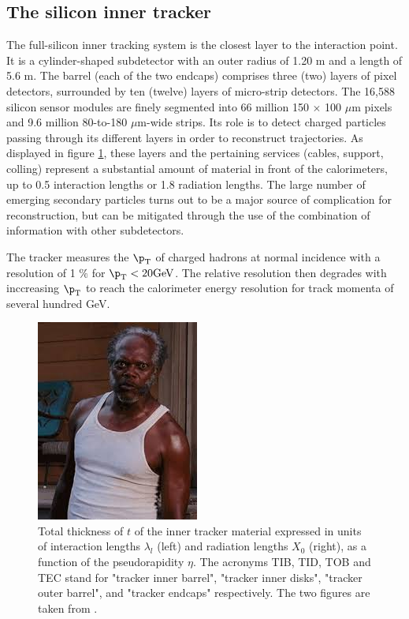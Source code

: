 \subsection{The silicon inner tracker}

The full-silicon inner tracking system \cite{Karimäki:368412,CERN-LHCC-2000-016} is the closest layer to the interaction point. It is a cylinder-shaped subdetector with an outer radius of 1.20 m and a length of 5.6 m. The barrel (each of the two endcaps) comprises three (two) layers of pixel detectors, surrounded by ten (twelve) layers of micro-strip detectors. The 16,588 silicon sensor modules are finely segmented into 66 million 150 $\times$ 100 $\mu$m pixels and 9.6 million 80-to-180 $\mu$m-wide strips. Its role is to detect charged particles passing through its different layers in order to reconstruct trajectories. As displayed in figure \ref{fig:tracker_material}, these layers and the pertaining services (cables, support, colling) represent a substantial amount of material in front of the calorimeters, up to 0.5 interaction lengths or 1.8 radiation lengths. The large number of emerging secondary particles turns out to be a major source of complication for reconstruction, but can be mitigated through the use of the combination of information with other subdetectors.

The tracker measures the $\p_{\mathrm{T}}$ of charged hadrons at normal incidence with a resolution of 1 $\%$ for $\p_{\mathrm{T}} < 20 \mathrm{GeV}$. The relative resolution then degrades with inccreasing $\p_{\mathrm{T}}$ to reach the calorimeter energy resolution for track momenta of several hundred GeV.

\begin{figure}
    \centering
    \includegraphics{Images/placeholder.jpeg}
    \caption{Total thickness of $t$ of the inner tracker material expressed in units of interaction lengths $\lambda_{l}$ (left) and radiation lengths $X_{0}$ (right), as a function of the pseudorapidity $\eta$. The acronyms TIB, TID, TOB and TEC stand for "tracker inner barrel", "tracker inner disks", "tracker outer barrel", and "tracker endcaps" respectively. The two figures are taken from \cite{Collaboration_2014}.}
    \label{fig:tracker_material}
\end{figure}

